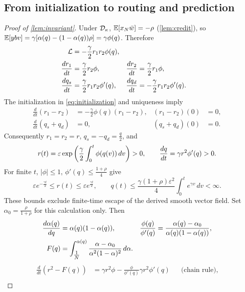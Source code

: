 \subsection{From initialization to routing and prediction}
\label{app:flow-proof}
\begin{proof}[Proof of \cref{lem:invariant}]
Under $\mathcal D_{\kappa}$, $\mathbb E[x_N\bar w]=-\rho$ (\cref{lem:credit}), so
$\mathbb E[y b v]=\gamma[\alpha(q)-(1-\alpha(q))\rho]=\gamma \phi(q)$. Therefore
\begin{align}
 \mathcal L&=-\frac{\gamma}{2}r_1r_2\phi(q),\notag\\
 \frac{d r_1}{d t}&=\frac{\gamma}{2}r_2\phi,&\frac{d r_2}{d t}&=\frac{\gamma}{2}r_1\phi,\label{eq:four-scalar-flow}\\
 \frac{d q_s}{d t}&=\frac{\gamma}{2}r_1r_2\phi'(q),&
 \frac{d q_d}{d t}&=-\frac{\gamma}{2}r_1r_2\phi'(q).\notag
\end{align}
The initialization in \cref{eq:initialization} and uniqueness imply
\begin{align*}
 \frac{d}{dt}(r_1-r_2)&=-\frac{\gamma}{2}\phi(q)(r_1-r_2),&(r_1-r_2)(0)&=0,\\
 \frac{d}{dt}(q_s+q_d)&=0,&(q_s+q_d)(0)&=0.
\end{align*}
Consequently $r_1=r_2=r$, $q_s=-q_d=\tfrac{q}{2}$, and
\begin{equation}
 r(t)=\varepsilon\exp\left(\frac{\gamma}{2}\int_0^t \phi(q(v))\,dv\right)>0,\qquad
 \frac{d q}{d t}=\gamma r^2\phi'(q)>0.
 \label{eq:balanced-flow}
\end{equation}
For finite $t$, $|\phi|\le1$, $\phi'(q)\le\tfrac{1+\rho}{4}$ give
\[
 \varepsilon e^{-\frac{\gamma t}{2}}\le r(t)\le \varepsilon e^{\frac{\gamma t}{2}},\qquad
 q(t)\le\frac{\gamma(1+\rho)\varepsilon^2}{4}\int_0^t e^{\gamma v}\,dv<\infty.
\]
These bounds exclude finite-time escape of the derived smooth vector field.
Set $\alpha_0=\tfrac{\rho}{1+\rho}$ for this calculation only. Then
\begin{align}
 \frac{d \alpha(q)}{d q}&=\alpha(q)(1-\alpha(q)),&
 \frac{\phi(q)}{\phi'(q)}&=\frac{\alpha(q)-\alpha_0}{\alpha(q)(1-\alpha(q))},\notag\\
 F(q)&=\int_{\tfrac{1}{N}}^{\alpha(q)}\frac{\alpha-\alpha_0}{\alpha^2(1-\alpha)^2}\,d\alpha.\label{eq:primitive}
\end{align}
\begin{align*}
 \frac{d}{dt}(r^2-F(q))
 &=\gamma r^2\phi-\frac{\phi}{\phi'(q)}\gamma r^2\phi'(q)
 &&\text{(chain rule)},\\

\end{align*}
\end{proof}
